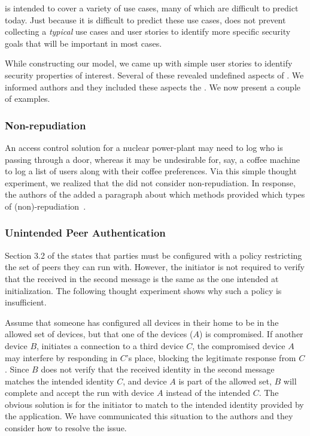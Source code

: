 \documentclass[runningheads, envcountsame, a4paper, draft, x11names]{llncs}
\newcommand{\spacehack}{\vspace{-1em}}
\begin{document}
\mEdhoc{} is intended to cover a variety of use cases, many of which are
difficult to predict today.
%
Just because it is difficult to predict these use cases, does not
prevent collecting a \emph{typical} use cases and user stories
to identify more specific security goals that will be important in most cases.
%

While constructing our model, we came up with simple user stories to identify
security properties of interest.
%
Several of these revealed undefined aspects of \mEdhoc{}.
%
We informed \mEdhoc{} authors and they included these aspects the \mSpec{}.
%
We now present a couple of examples.
%

\spacehack
\subsubsection{Non-repudiation}
An access control solution for a nuclear power-plant may need to log who is
passing through a door, whereas it may be undesirable for, say, a coffee
machine to log a list of users along with their coffee preferences.
%
Via this simple thought experiment, we realized that the \mSpec{} did not
consider non-repudiation.
%
In response, the authors of the \mSpec{} added a paragraph about which methods
provided which types of (non)-repudiation~\cite{personalCommunication}.

\spacehack
\subsubsection{Unintended Peer Authentication}
Section 3.2 of the \mSpec{} states that parties must be configured
with a policy restricting the set of peers they can run \mEdhoc{} with.
%
However, the initiator is not required to verify that the \mIdcredr{} received
in the second message is the same as the one intended at initialization.
%
The following thought experiment shows why such a policy is insufficient.
%

Assume that someone has configured all devices in their home to be in the
allowed set of devices, but that one of the devices ($A$) is compromised.
%
If another device $B$, initiates a connection to a third device $C$, the
compromised device $A$ may interfere by responding in $C$'s place, blocking
the legitimate response from $C$.
%
Since $B$ does not verify that the received identity in the second message
matches the intended identity $C$, and device $A$ is part of the allowed set,
$B$ will complete and accept the \mEdhoc{} run with device $A$ instead of the
intended $C$.
%
The obvious solution is for the initiator to match \mIdcredr{} to the intended
identity provided by the application.
%
We have communicated this situation to the \mEdhoc{} authors and they consider
how to resolve the issue.
%
\end{document}
